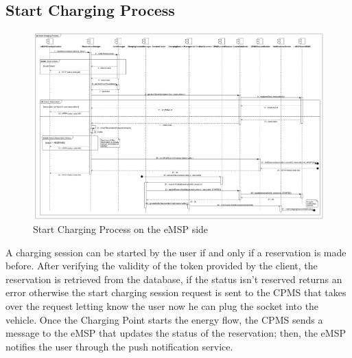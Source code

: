 \documentclass{Configuration_Files/PoliMi3i_thesis}
\begin{document}
\subsection{Start Charging Process}
\begin{figure}[H]
    \centering
    \includegraphics[width=1\textwidth]{Images/sequenceDiagrams/Start Charging Process.jpg}
    \caption{Start Charging Process on the eMSP side}
\end{figure}
A charging session can be started by the user if and only if a reservation is made before. After verifying the validity of the token provided by the client, the reservation is retrieved from the database, if the status isn't reserved returns an error otherwise the start charging session request is sent to the CPMS that takes over the request letting know the user now he can plug the socket into the vehicle. Once the Charging Point starts the energy flow, the CPMS sends a message to the eMSP that updates the status of the reservation; then, the eMSP notifies the user through the push notification service.
\end{document}

